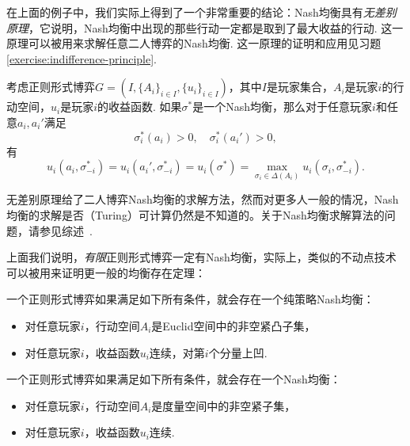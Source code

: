 在上面的例子中，我们实际上得到了一个非常重要的结论：Nash均衡具有\textit{无差别原理}，它说明，Nash均衡中出现的那些行动一定都是取到了最大收益的行动. 这一原理可以被用来求解任意二人博弈的Nash均衡. 这一原理的证明和应用见习题 \ref{exercise:indifference-principle}. 

\begin{theorem}[无差别原理]\label{thm:indifference-principle}
考虑正则形式博弈$G=(I,\{A_i\}_{i\in I},\{u_i\}_{i\in I})$，其中$I$是玩家集合，$A_i$是玩家$i$的行动空间，$u_i$是玩家$i$的收益函数. 如果$\sigma^*$是一个Nash均衡，那么对于任意玩家$i$和任意$a_i,a_i'$满足
\[\sigma^*_i(a_i)>0,\quad \sigma^*_i(a_i')>0,\]
有
\[u_i(a_i,\sigma^*_{-i})=u_i(a_i',\sigma^*_{-i})=u_i(\sigma^*)=\max_{\sigma_i\in\Delta(A_i)}u_i(\sigma_i,\sigma^*_{-i}).\]
\end{theorem}

\begin{remark}
    无差别原理给了二人博弈Nash均衡的求解方法，然而对更多人一般的情况，Nash均衡的求解是否（Turing）可计算仍然是不知道的。关于Nash均衡求解算法的问题，请参见综述~\cite{liSurveyAlgorithmsNash2024}.
\end{remark}

上面我们说明，\textit{有限}正则形式博弈一定有Nash均衡，实际上，类似的不动点技术可以被用来证明更一般的均衡存在定理：

\begin{theorem}
    一个正则形式博弈如果满足如下所有条件，就会存在一个纯策略Nash均衡： 
    \begin{itemize}
        \item 对任意玩家$i$，行动空间$A_i$是Euclid空间中的非空紧凸子集，
        \item 对任意玩家$i$，收益函数$u_i$连续，对第$i$个分量上凹. 
    \end{itemize}
\end{theorem}

\begin{theorem}
    一个正则形式博弈如果满足如下所有条件，就会存在一个Nash均衡：
    \begin{itemize}
        \item 对任意玩家$i$，行动空间$A_i$是度量空间中的非空紧子集，
        \item 对任意玩家$i$，收益函数$u_i$连续. 
    \end{itemize}
\end{theorem}

